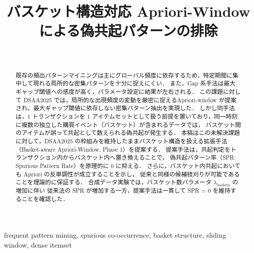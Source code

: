 \documentclass[conference]{IEEEtran}
\begin{document}
\title{バスケット構造対応 Apriori-Window による偽共起パターンの排除}

\author{
  \\
}

\maketitle

\begin{abstract}
既存の頻出パターンマイニングは主にグローバル頻度に依存するため，特定期間に集中して現れる局所的な密集パターンを十分に捉えにくい．
また，Gap 系手法は最大ギャップ閾値への感度が高く，パラメータ設定に結果が左右される．
この課題に対して DSAA2025 では，局所的な出現頻度の変動を厳密に捉えるApriori-window が提案され，最大ギャップ閾値に依存しない密集パターン抽出を実現した．
しかし同手法は，1 トランザクションを 1 アイテムセットとして扱う前提を置いており，同一時刻に複数の独立した購買イベント（バスケット）が含まれるデータでは，
バスケット間のアイテムが誤って共起として数えられる偽共起が発生する．
本稿はこの未解決課題に対して，DSAA2025 の枠組みを維持したままバスケット構造を扱える拡張手法（Basket-aware Apriori-Window, Phase 1）を提案する．
提案手法は，共起判定をトランザクション内からバスケット内へ置き換えることで，
偽共起パターン率（SPR: Spurious Pattern Rate）を原理的に 0 に抑える．
さらに，バスケット内共起においても Apriori の反単調性が成立することを示し，
従来と同様の候補枝刈りが可能であることを理論的に保証する．
合成データ実験では，バスケット数パラメータ $\lambda_{\text{baskets}}$ の増加に伴い
従来法の SPR が増加する一方，提案手法は一貫して SPR = 0 を維持することを確認した．
\end{abstract}

\begin{IEEEkeywords}
frequent pattern mining, spurious co-occurrence, basket structure,
sliding window, dense itemset
\end{IEEEkeywords}


% 





\end{document}
